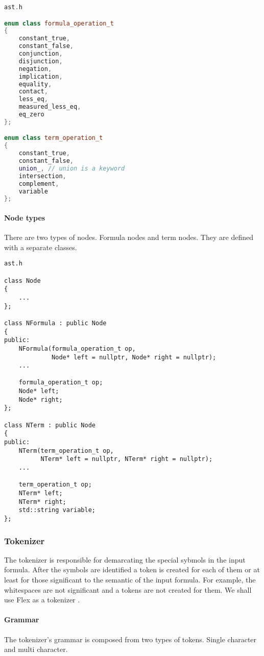 \documentclass{article}
\begin{document}
\begin{lstlisting}[language=C++]
ast.h

enum class formula_operation_t
{
    constant_true,
    constant_false,
    conjunction,
    disjunction,
    negation,
    implication,
    equality,
    contact,
    less_eq,
    measured_less_eq,
    eq_zero
};

enum class term_operation_t
{
    constant_true,
    constant_false,
    union_, // union is a keyword
    intersection,
    complement,
    variable
};
\end{lstlisting}

	\newpage
	\paragraph{Node types} There are two types of nodes. Formula nodes and term nodes. They are defined with a separate classes.

\begin{lstlisting}
ast.h

class Node
{
    ...
};

class NFormula : public Node
{
public:
    NFormula(formula_operation_t op,
             Node* left = nullptr, Node* right = nullptr);
    ...

    formula_operation_t op;
    Node* left;
    Node* right;
};

class NTerm : public Node
{
public:
    NTerm(term_operation_t op,
          NTerm* left = nullptr, NTerm* right = nullptr);
    ...

    term_operation_t op;
    NTerm* left;
    NTerm* right;
    std::string variable;
};
\end{lstlisting}

	\subsubsection{Tokenizer}
	The tokenizer is responsible for demarcating the special sybmols in the input formula.
	After the symbols are identified a token is created for each of them or at least for those significant to the semantic of the input formula.
	For example, the whitespaces are not significant and a tokens are not created for them.
	We shall use Flex as a tokenizer \cite{flex-tokenizer}.

	\paragraph{Grammar} The tokenizer's grammar is composed from two types of tokens. Single character and multi character.
\end{document}
